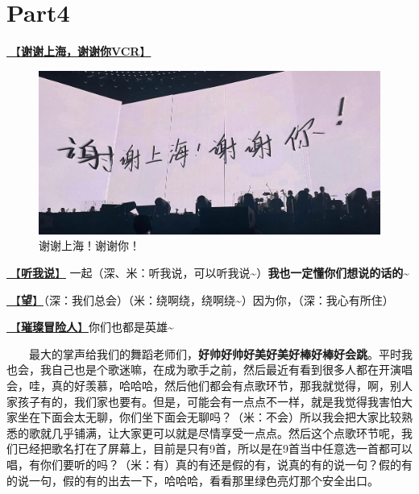 \documentclass[]{ctexbook}
\begin{document}
\section{Part4}\label{shanghai-20240518-part4}

\hyperref[thank-you-vcr]{🎥【\textbf{谢谢上海，谢谢你VCR}】}

\begin{figure}

{\centering \includegraphics[width=350pt]{img/shanghai20240518/thank-shanghai} 

}

\caption{谢谢上海！谢谢你！}\label{fig:unnamed-chunk-34}
\end{figure}

\hyperref[listen-to-me]{🎵【\textbf{听我说}】} 一起（深、米：听我说，可以听我说\textasciitilde）\textbf{我也一定懂你们想说的话的\textasciitilde{}}

\hyperref[hope]{🎵【\textbf{望}】}（深：我们总会）（米：绕啊绕，绕啊绕\textasciitilde）因为你，（深：我心有所住）

\hyperref[adventurers]{🎵【\textbf{璀璨冒险人}】}你们也都是英雄\textasciitilde{}

  最大的掌声给我们的舞蹈老师们，\textbf{好帅好帅好美好美好棒好棒好会跳}。平时我也会，我自己也是个歌迷嘛，在成为歌手之前，然后最近有看到很多人都在开演唱会，哇，真的好羡慕，哈哈哈，然后他们都会有点歌环节，那我就觉得，啊，别人家孩子有的，我们家也要有。但是，可能会有一点点不一样，就是我觉得我害怕大家坐在下面会太无聊，你们坐下面会无聊吗？（米：不会）所以我会把大家比较熟悉的歌就几乎铺满，让大家更可以就是尽情享受一点点。然后这个点歌环节呢，我们已经把歌名打在了屏幕上，目前是只有9首，所以是在9首当中任意选一首都可以唱，有你们要听的吗？（米：有）真的有还是假的有，说真的有的说一句？假的有的说一句，假的有的出去一下，哈哈哈，看看那里绿色亮灯那个安全出口。
\end{document}
